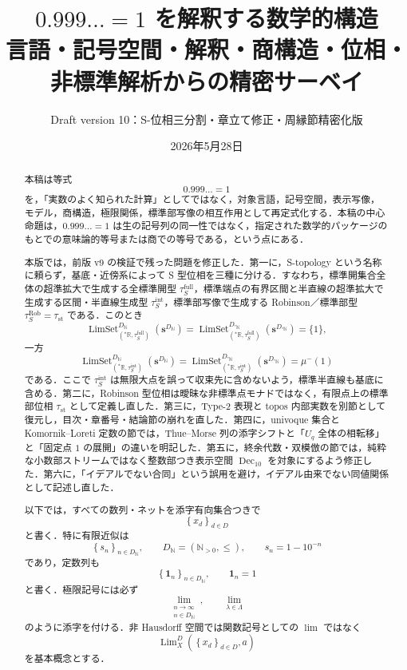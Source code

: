 \documentclass[a4paper,11pt]{ltjsarticle}
\title{\Large \(0.999\ldots=1\) を解釈する数学的構造\\
\normalsize 言語・記号空間・解釈・商構造・位相・非標準解析からの精密サーベイ}
\author{Draft version 10：S-位相三分割・章立て修正・周縁節精密化版}
\date{2026年5月28日}
\theoremstyle{jpdef}
\theoremstyle{jpthm}
\newcommand{\N}{\mathbb{N}}
\newcommand{\R}{\mathbb{R}}
\newcommand{\Dec}{\operatorname{Dec}_{10}}
\newcommand{\Lim}{\operatorname{Lim}}
\newcommand{\LimSet}{\operatorname{LimSet}}
\newcommand{\Ns}{\N_{>0}}
\newcommand{\DN}{D_{\N}}
\newcommand{\DStarN}{D_{{}^{\ast}\N}}
\newcommand{\seq}[2]{\left\{#1\right\}_{#2}}
\newcommand{\ulim}[1]{{}^{\ast}#1}
\newcommand{\taufullS}{\tau^{\mathrm{full}}_{S}}
\newcommand{\tauintS}{\tau^{\mathrm{int}}_{S}}
\newcommand{\taust}{\tau_{\mathrm{st}}}
\newcommand{\tauRobS}{\tau^{\mathrm{Rob}}_{S}}
\begin{document}
\maketitle

\begin{abstract}
本稿は等式
\[
 0.999\ldots=1
\]
を，「実数のよく知られた計算」としてではなく，対象言語，記号空間，表示写像，モデル，商構造，極限関係，標準部写像の相互作用として再定式化する．本稿の中心命題は，\(0.999\ldots=1\) は生の記号列の同一性ではなく，指定された数学的パッケージのもとでの意味論的等号または商での等号である，という点にある．

本版では，前版 v9 の検証で残った問題を修正した．第一に，S-topology という名称に頼らず，基底・近傍系によって S 型位相を三種に分ける．すなわち，標準開集合全体の超準拡大で生成する全標準開型 \(\taufullS\)，標準端点の有界区間と半直線の超準拡大で生成する区間・半直線生成型 \(\tauintS\)，標準部写像で生成する Robinson／標準部型 \(\tauRobS=\taust\) である．このとき
\[
\LimSet^{\DN}_{(\ulim\R,\taufullS)}(\mathbf s^{\DN})
=
\LimSet^{\DStarN}_{(\ulim\R,\taufullS)}(\mathbf s^{\DStarN})
=\{1\},
\]
一方
\[
\LimSet^{\DN}_{(\ulim\R,\tauintS)}(\mathbf s^{\DN})
=
\LimSet^{\DStarN}_{(\ulim\R,\tauintS)}(\mathbf s^{\DStarN})
=\mu^-(1)
\]
である．ここで \(\tauintS\) は無限大点を誤って収束先に含めないよう，標準半直線も基底に含める．第二に，Robinson 型位相は曖昧な非標準点モナドではなく，有限点上の標準部位相 \(\taust\) として定義し直した．第三に，Type-2 表現と topos 内部実数を別節として復元し，目次・章番号・結論節の崩れを直した．第四に，univoque 集合と Komornik--Loreti 定数の節では，Thue--Morse 列の添字シフトと「\(U_q\) 全体の相転移」と「固定点 \(1\) の展開」の違いを明記した．第五に，終余代数・双模倣の節では，純粋な小数部ストリームではなく整数部つき表示空間 \(\Dec\) を対象にするよう修正した．第六に，「イデアルでない合同」という誤用を避け，イデアル由来でない同値関係として記述し直した．

以下では，すべての数列・ネットを添字有向集合つきで
\[
  \seq{x_d}{d\in D}
\]
と書く．特に有限近似は
\[
  \seq{s_n}{n\in\DN},\qquad \DN=(\Ns,\le),\qquad s_n=1-10^{-n}
\]
であり，定数列も
\[
  \seq{\mathbf1_n}{n\in\DN},\qquad \mathbf1_n=1
\]
と書く．極限記号には必ず
\[
  \lim_{\substack{n\to\infty\\ n\in\DN}},\qquad \lim_{\lambda\in\Lambda}
\]
のように添字を付ける．非 Hausdorff 空間では関数記号としての \(\lim\) ではなく
\[
  \Lim_X^D(\seq{x_d}{d\in D},a)
\]
を基本概念とする．
\end{abstract}

\tableofcontents
\end{document}
